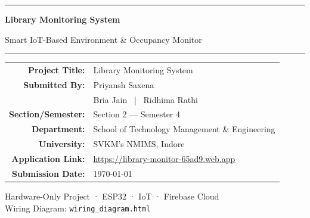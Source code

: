 \documentclass[12pt,a4paper]{article}
\begin{document}
\begin{titlepage}
\centering
\vspace*{1cm}

{\color{primary}\rule{\linewidth}{0.8pt}}
\vspace{0.4cm}

{\fontsize{26}{32}\selectfont\bfseries\color{primary}
Library Monitoring System}

\vspace{0.2cm}
{\Large\color{accent} Smart IoT-Based Environment \& Occupancy Monitor}

\vspace{0.4cm}
{\color{primary}\rule{\linewidth}{0.8pt}}

\vspace{2cm}


\vspace{1.5cm}

\begin{tabular}{rl}
  \textbf{\color{primary}Project Title:}   & Library Monitoring System \\[6pt]
  \textbf{\color{primary}Submitted By:}    & Priyansh Saxena \\[4pt]
                                            & Bria Jain \ | \ Ridhima Rathi \\[6pt]
  \textbf{\color{primary}Section/Semester:}& Section 2 — Semester 4 \\[6pt]
  \textbf{\color{primary}Department:}      & School of Technology Management \& Engineering \\[6pt]
  \textbf{\color{primary}University:}      & SVKM's NMIMS, Indore \\[6pt]
  \textbf{\color{primary}Application Link:}& \url{https://library-monitor-65ad9.web.app} \\[6pt]
  \textbf{\color{primary}Submission Date:} & \today \\
\end{tabular}

\vfill


{\small\color{gray} Hardware-Only Project · ESP32 · IoT · Firebase Cloud}\\[4pt]
{\tiny\color{gray} Wiring Diagram: \texttt{wiring\_diagram.html}}

\end{titlepage}
\end{document}
